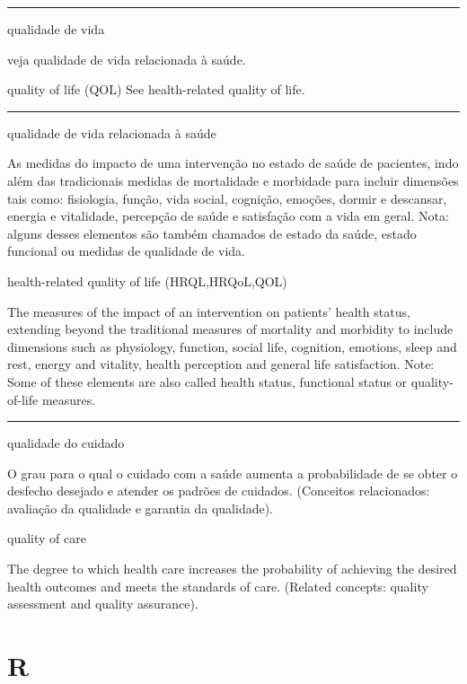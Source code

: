 \documentclass[
]{book}
\begin{document}
\begin{center}\rule{0.5\linewidth}{0.5pt}\end{center}

qualidade de vida

veja qualidade de vida relacionada à saúde.

quality of life (QOL)
See health-related quality of life.

\begin{center}\rule{0.5\linewidth}{0.5pt}\end{center}

qualidade de vida relacionada à saúde

As medidas do impacto de uma intervenção no estado de saúde de pacientes, indo além das tradicionais medidas de mortalidade e morbidade para incluir dimensões tais como: fisiologia, função, vida social, cognição, emoções, dormir e descansar, energia e vitalidade, percepção de saúde e satisfação com a vida em geral. Nota: alguns desses elementos são também chamados de estado da saúde, estado funcional ou medidas de qualidade de vida.

health-related quality of life (HRQL,HRQoL,QOL)

The measures of the impact of an intervention on patients' health status, extending beyond the traditional measures of mortality and morbidity to include dimensions such as physiology, function, social life, cognition, emotions, sleep and rest, energy and vitality, health perception and general life satisfaction. Note: Some of these elements are also called health status, functional status or quality-of-life measures.

\begin{center}\rule{0.5\linewidth}{0.5pt}\end{center}

qualidade do cuidado

O grau para o qual o cuidado com a saúde aumenta a probabilidade de se obter o desfecho desejado e atender os padrões de cuidados. (Conceitos relacionados: avaliação da qualidade e garantia da qualidade).

quality of care

The degree to which health care increases the probability of achieving the desired health outcomes and meets the standards of care. (Related concepts: quality assessment and quality assurance).

\hypertarget{r}{%
\chapter*{R}\label{r}}
\end{document}
